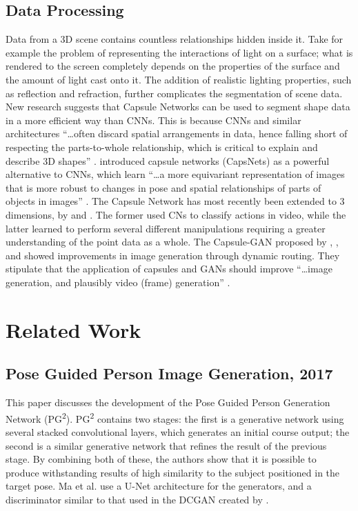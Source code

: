 \documentclass{article}
\begin{document}
\subsection{Data Processing}
\label{subsec:data_processing}
Data from a 3D scene contains countless relationships hidden inside it.
Take for example the problem of representing the
interactions of light on a surface;
what is rendered to the screen completely depends on
the properties of the surface and the amount of light cast onto it.
The addition of realistic lighting properties, such as reflection and refraction,
further complicates the segmentation of scene data.
New research suggests that
Capsule Networks can be used to segment shape data in a
more efficient way than CNNs. This is because CNNs and similar architectures
``\dots often discard
spatial arrangements in data, hence falling short of respecting
the parts-to-whole relationship, which is critical to explain
and describe 3D shapes'' \cite{3D_capsule_networks}.
\cite{dynamic_routing} introduced capsule networks (CapsNets) as a powerful
alternative to CNNs, which learn ``\dots a more equivariant representation of 
images that is more robust to changes in pose and spatial relationships of parts of objects in images'' \cite{transforming_auto_encoders}.
The Capsule Network has most recently been extended to 3 dimensions, by
\cite{video_capsule} and \cite{3D_capsule_networks}.
The former used CNs to classify actions in video,
while the latter learned to perform several different manipulations
requiring a greater understanding of the point data as a whole.
The Capsule-GAN proposed by \cite{capsule_synthesis}, \cite{capsgan},
and \cite{capsule_gan}
showed improvements in image generation through dynamic routing.
They stipulate that the application of capsules and GANs should improve
``\dots image generation, and plausibly video (frame) generation''
\cite{capsgan}.

\section{Related Work}
\label{sec:related}

\subsection*{Pose Guided Person Image Generation, 2017}
\nocite{pose_guided_image_generation}
This paper discusses the development of the Pose Guided Person Generation
Network (PG\textsuperscript{2}). PG\textsuperscript{2} contains two stages:
the first is a generative network using several stacked convolutional layers,
which generates an initial course output;
the second is a similar generative network that refines the
result of the previous stage. By combining both of these,
the authors show that it is possible to produce withstanding results of
high similarity to the subject positioned in the target pose.
Ma et al. use a U-Net architecture for the generators, and a discriminator
similar to that used in the DCGAN created by
\cite{unsupervised_learning}.
\end{document}
